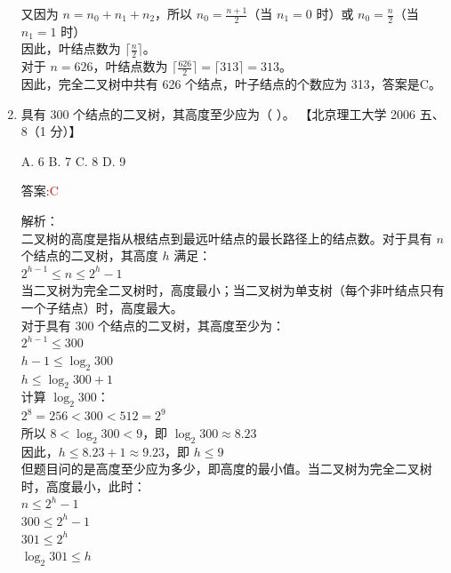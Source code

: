 \documentclass[lang=cn,newtx,10pt,scheme=chinese]{../../../elegantbook}
\begin{document}
\begin{enumerate}
    又因为 $n = n_0 + n_1 + n_2$，所以 $n_0 = \frac{n+1}{2}$（当 $n_1 = 0$ 时）或 $n_0 = \frac{n}{2}$（当 $n_1 = 1$ 时）\\
    
    因此，叶结点数为 $\lceil \frac{n}{2} \rceil$。\\
    
    对于 $n = 626$，叶结点数为 $\lceil \frac{626}{2} \rceil = \lceil 313 \rceil = 313$。\\
    
    因此，完全二叉树中共有 626 个结点，叶子结点的个数应为 313，答案是C。\\  

    \item 具有 300 个结点的二叉树，其高度至少应为（ ）。  
    【北京理工大学 2006 五、8（1 分）】  

    A. 6 \quad B. 7 \quad C. 8 \quad D. 9  
    
    答案:\textcolor{red}{C}
    
    解析：\\
    二叉树的高度是指从根结点到最远叶结点的最长路径上的结点数。对于具有 $n$ 个结点的二叉树，其高度 $h$ 满足：\\
    $2^{h-1} \leq n \leq 2^h - 1$\\
    
    当二叉树为完全二叉树时，高度最小；当二叉树为单支树（每个非叶结点只有一个子结点）时，高度最大。\\
    
    对于具有 300 个结点的二叉树，其高度至少为：\\
    $2^{h-1} \leq 300$\\
    $h-1 \leq \log_2 300$\\
    $h \leq \log_2 300 + 1$\\
    
    计算 $\log_2 300$：\\
    $2^8 = 256 < 300 < 512 = 2^9$\\
    所以 $8 < \log_2 300 < 9$，即 $\log_2 300 \approx 8.23$\\
    
    因此，$h \leq 8.23 + 1 \approx 9.23$，即 $h \leq 9$\\
    
    但题目问的是高度至少应为多少，即高度的最小值。当二叉树为完全二叉树时，高度最小，此时：\\
    $n \leq 2^h - 1$\\
    $300 \leq 2^h - 1$\\
    $301 \leq 2^h$\\
    $\log_2 301 \leq h$\\
    

\end{enumerate}
\end{document}

